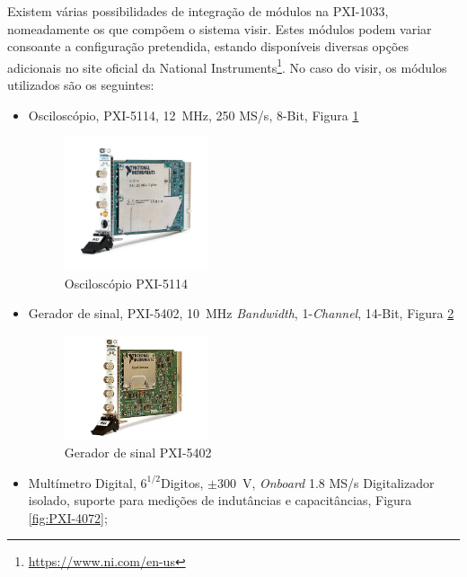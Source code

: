 Existem várias possibilidades de integração de módulos na PXI-1033, nomeadamente os que compõem o sistema \acrshort{visir}. Estes módulos podem variar consoante a configuração pretendida, estando disponíveis diversas opções adicionais no site oficial da National Instruments\footnote{\url{https://www.ni.com/en-us}}. No caso do \acrshort{visir}, os módulos utilizados são os seguintes:
\begin{itemize}
    \item Osciloscópio, PXI-5114, \SI{12}{\MHz}, 250 MS/s, 8-Bit, Figura \ref{fig:PXI-5114}
          \begin{figure}[hbtp]
              \centering
              \includegraphics[width=0.4\textwidth]{figures/PXI-5114.png}
              \caption{Osciloscópio PXI-5114 \cite{PXI-5114}}
              \label{fig:PXI-5114}
          \end{figure}
    \item Gerador de sinal, PXI-5402, \SI{10}{\MHz} \textit{Bandwidth}, 1-\textit{Channel}, 14-Bit, Figura \ref{fig:PXI-5402}
          \begin{figure}[hbtp]
              \centering
              \includegraphics[width=0.4\textwidth]{figures/PXI-5402.png}
              \caption{Gerador de sinal PXI-5402 \cite{PXI-5402}}
              \label{fig:PXI-5402}
          \end{figure}
    \item Multímetro Digital, \(6^{1/2} \)Digitos, \(\pm\)\SI{300}{\volt}, \textit{Onboard} 1.8 MS/s Digitalizador isolado, suporte para medições de indutâncias e capacitâncias, Figura \ref{fig:PXI-4072};
          \begin{figure}[hbtp]

\end{figure}
\end{itemize}
